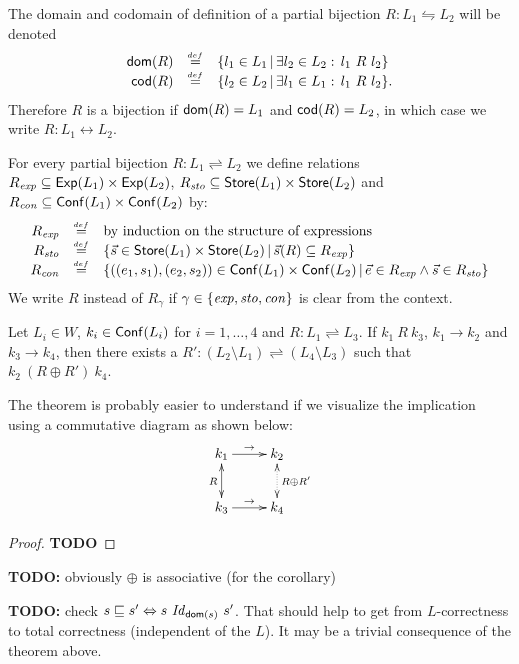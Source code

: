 \documentclass[12pt,a4paper]{article}
\newcommand{\Conf}{\sstyle{Conf}}
\newcommand{\scon}{\nstyle{con}}
\newcommand{\sexp}{\nstyle{exp}}
\newcommand{\ssto}{\nstyle{sto}}
\begin{document}
The domain and codomain of definition of a partial bijection $R: L_1 \leftrightharpoons L_2$ will
be denoted
\[\begin{array}{rcl}
  \mathsf{dom}(R) &\stackrel{_{def}}{=}& \{ l_1 \in L_1\,|\, \exists l_2\in L_2:\,l_1\ R\ l_2\} \\
  \mathsf{cod}(R) &\stackrel{_{def}}{=}& \{ l_2 \in L_2\,|\, \exists l_1\in L_1:\,l_1\ R\ l_2\} .
\end{array}\]
Therefore $R$ is a bijection if $\mathsf{dom}(R) = L_1$ and $\mathsf{cod}(R) = L_2$, in which case we
write $R: L_1 \leftrightarrow L_2$.

For every partial bijection $R: L_1 \rightleftharpoons L_2$ we define relations
$R_{\sexp} \subseteq \Exp(L_1) \times \Exp(L_2)$, $R_{\ssto} \subseteq \Store(L_1) \times \Store(L_2)$
and $R_{\scon} \subseteq \Conf(L_1) \times \Conf(L_2)$ by:
\[\begin{array}{rcl}
  R_{\sexp} &\defeqn& \text{by induction on the structure of expressions} \\
  R_{\ssto} &\defeqn& \{ \vec{s} \in \Store(L_1) \times \Store(L_2)\,|\,\vec{s}(R) \subseteq R_{\sexp}\} \\
  R_{\scon} &\defeqn& \{((e_1,s_1),(e_2,s_2))\in\Conf(L_1)\times\Conf(L_2)\,|\,\vec{e}\in R_{\sexp}\wedge\vec{s}\in R_{\ssto}\}
\end{array}\]
We write $R$ instead of $R_\gamma$ if $\gamma\in\{\sexp,\ssto,\scon\}$ is clear from the context.

\begin{theorem}
  Let $L_i\in W$, $k_i\in\Conf(L_i)$ for $i=1,\ldots,4$ and  $R: L_1 \rightleftharpoons L_3$. If
  $k_1\ R\ k_3$, $k_1 \to k_2$ and $k_3 \to k_4$, then there exists a
  $R': (L_2 \setminus L_1) \rightleftharpoons (L_4\setminus L_3)$ such that $k_2\ (R \oplus R')\ k_4$.
\end{theorem}

The theorem is probably easier to understand if we visualize the implication using a commutative
diagram as shown below:
\[
\xymatrix{
  k_1 \ar[r]^{\to} \ar@{<->}[d]_{R} & k_2 \ar@{<.>}[d]^{R\oplus R'} \\
  k_3 \ar[r]^{\to} & k_4
}
\]

\begin{proof}
  {\bf TODO}
\end{proof}

{\bf TODO:} obviously $\oplus$ is associative (for the corollary)

{\bf TODO:} check $s \sqsubseteq s' \Leftrightarrow s\ \Id_{\dom{s}}\ s'$.
That should help to get from $L$-correctness to total correctness (independent of the $L$). It may be a trivial
consequence of the theorem above.
\end{document}

